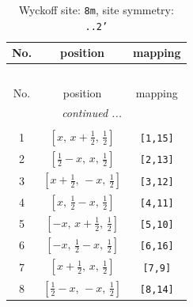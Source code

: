 \documentclass[fleqn,8pt]{jsarticle}
\begin{document}
\begin{longtable}{ccc}
\caption{Wyckoff site: {\tt 8m}, site symmetry: {\tt ..2'}}
 \\
 \hline \hline
No. & position & mapping \\ \hline \endfirsthead

\multicolumn{2}{l}{\tablename\ \thetable{}} \\
 \hline \hline
No. & position & mapping \\ \hline \endhead

 \hline \hline
\multicolumn{2}{r}{\footnotesize\it continued ...} \\ \endfoot

 \hline \hline
\multicolumn{2}{r}{} \\ \endlastfoot

1 & $\left[ x,\, x + \frac{1}{2},\, \frac{1}{2} \right]$ & {\tt [1,15]} \\ \hline
2 & $\left[ \frac{1}{2} - x,\, x,\, \frac{1}{2} \right]$ & {\tt [2,13]} \\ \hline
3 & $\left[ x + \frac{1}{2},\, - x,\, \frac{1}{2} \right]$ & {\tt [3,12]} \\ \hline
4 & $\left[ x,\, \frac{1}{2} - x,\, \frac{1}{2} \right]$ & {\tt [4,11]} \\ \hline
5 & $\left[ - x,\, x + \frac{1}{2},\, \frac{1}{2} \right]$ & {\tt [5,10]} \\ \hline
6 & $\left[ - x,\, \frac{1}{2} - x,\, \frac{1}{2} \right]$ & {\tt [6,16]} \\ \hline
7 & $\left[ x + \frac{1}{2},\, x,\, \frac{1}{2} \right]$ & {\tt [7,9]} \\ \hline
8 & $\left[ \frac{1}{2} - x,\, - x,\, \frac{1}{2} \right]$ & {\tt [8,14]} \\
\end{longtable}
\renewcommand{\arraystretch}{1.2}
\end{document}
